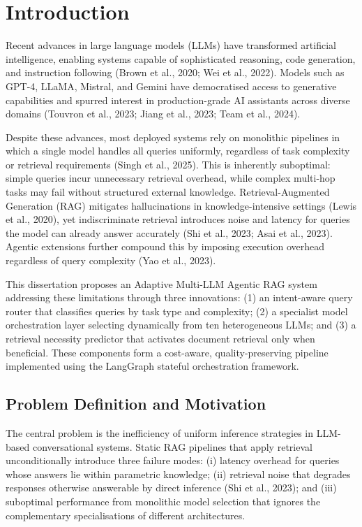 \documentclass[12pt,a4paper]{article}
\begin{document}

\section{Introduction}
\label{sec:introduction}

Recent advances in large language models (LLMs) have transformed artificial intelligence, enabling systems capable of sophisticated reasoning, code generation, and instruction following (Brown et al., 2020; Wei et al., 2022). Models such as GPT-4, LLaMA, Mistral, and Gemini have democratised access to generative capabilities and spurred interest in production-grade AI assistants across diverse domains (Touvron et al., 2023; Jiang et al., 2023; Team et al., 2024).

Despite these advances, most deployed systems rely on monolithic pipelines in which a single model handles all queries uniformly, regardless of task complexity or retrieval requirements (Singh et al., 2025). This is inherently suboptimal: simple queries incur unnecessary retrieval overhead, while complex multi-hop tasks may fail without structured external knowledge. Retrieval-Augmented Generation (RAG) mitigates hallucinations in knowledge-intensive settings (Lewis et al., 2020), yet indiscriminate retrieval introduces noise and latency for queries the model can already answer accurately (Shi et al., 2023; Asai et al., 2023). Agentic extensions further compound this by imposing execution overhead regardless of query complexity (Yao et al., 2023).

This dissertation proposes an Adaptive Multi-LLM Agentic RAG system addressing these limitations through three innovations: (1) an intent-aware query router that classifies queries by task type and complexity; (2) a specialist model orchestration layer selecting dynamically from ten heterogeneous LLMs; and (3) a retrieval necessity predictor that activates document retrieval only when beneficial. These components form a cost-aware, quality-preserving pipeline implemented using the LangGraph stateful orchestration framework.

\subsection{Problem Definition and Motivation}
\label{subsec:problem_motivation}

The central problem is the inefficiency of uniform inference strategies in LLM-based conversational systems. Static RAG pipelines that apply retrieval unconditionally introduce three failure modes: (i) latency overhead for queries whose answers lie within parametric knowledge; (ii) retrieval noise that degrades responses otherwise answerable by direct inference (Shi et al., 2023); and (iii) suboptimal performance from monolithic model selection that ignores the complementary specialisations of different architectures.
\end{document}
